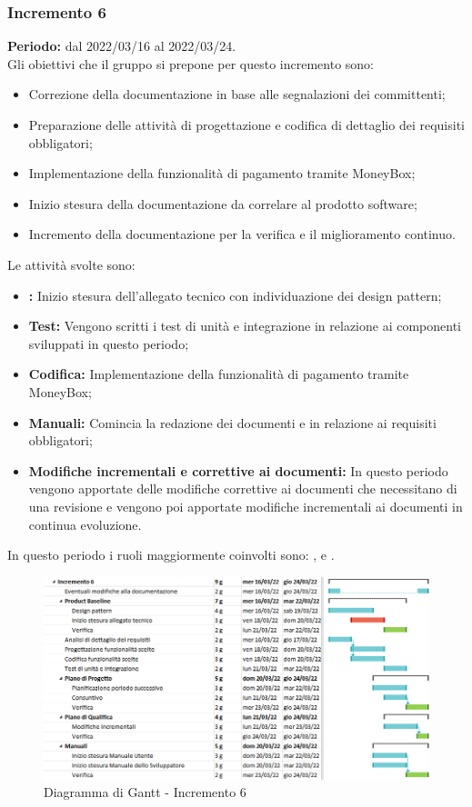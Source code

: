 \subsubsection{Incremento 6} \label{subsubsection:incremento_6}
\textbf{Periodo:} dal 2022/03/16 al 2022/03/24.
\bigskip
\\Gli obiettivi che il gruppo si prepone per questo incremento sono:
\begin{itemize}
  \item Correzione della documentazione in base alle segnalazioni dei committenti;
  \item Preparazione delle attività di progettazione e codifica di dettaglio dei requisiti obbligatori;
  \item Implementazione della funzionalità di pagamento tramite MoneyBox\glo{};
  \item Inizio stesura della documentazione da correlare al prodotto software;
  \item Incremento della documentazione per la verifica e il miglioramento continuo.
\end{itemize}
Le attività svolte sono:
\begin{itemize}
  \item \textbf{\PB{}:} Inizio stesura dell’allegato tecnico con individuazione dei design pattern;
  \item \textbf{Test:} Vengono scritti i test di unità e integrazione in relazione ai componenti sviluppati in questo periodo;
  \item \textbf{Codifica:} Implementazione della funzionalità di pagamento tramite MoneyBox\glo{};
  \item \textbf{Manuali:} Comincia la redazione dei documenti \docNameVersionMU{} e \docNameVersionMS{} in relazione ai requisiti obbligatori;
  \item \textbf{Modifiche incrementali e correttive ai documenti:} In questo periodo vengono apportate delle modifiche correttive ai documenti che necessitano di una revisione e vengono poi apportate modifiche incrementali ai documenti in continua evoluzione.
\end{itemize}
In questo periodo i ruoli maggiormente coinvolti sono: \roleDesignerLow{}, \roleProgrammerLow{} e \roleVerifierLow{}.
\bigskip
\begin{figure}[H]
  \centering
  \includegraphics[scale=0.52]{immagini/incremento_6.png}
  \caption{Diagramma di Gantt - Incremento 6}
\end{figure}

